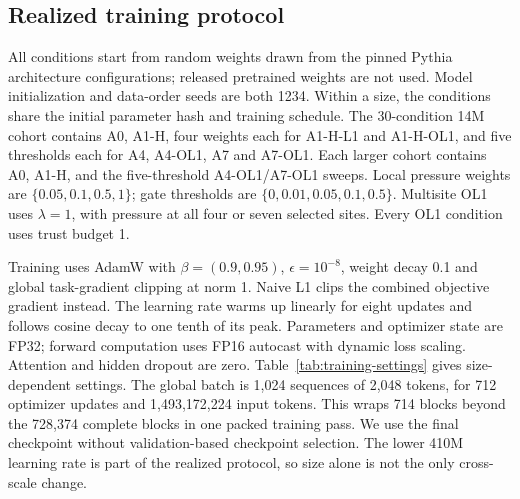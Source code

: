 \subsection{Realized training protocol}
\label{app:training-protocol}

All conditions start from random weights drawn from the pinned Pythia
architecture configurations; released pretrained weights are not used.
Model initialization and data-order seeds are both 1234. Within a size, the
conditions share the initial parameter hash and training schedule. The
30-condition 14M cohort contains A0, A1-H, four weights each for A1-H-L1 and
A1-H-OL1, and five thresholds each for A4, A4-OL1, A7 and A7-OL1. Each
larger cohort contains A0, A1-H, and the five-threshold A4-OL1/A7-OL1 sweeps.
Local pressure weights are $\{0.05,0.1,0.5,1\}$; gate thresholds are
$\{0,0.01,0.05,0.1,0.5\}$. Multisite OL1 uses $\lambda=1$, with pressure
at all four or seven selected sites. Every OL1 condition uses trust budget 1.

Training uses AdamW with $\beta=(0.9,0.95)$, $\epsilon=10^{-8}$, weight
decay 0.1 and global task-gradient clipping at norm 1. Naive L1 clips the
combined objective gradient instead. The learning rate warms up linearly
for eight updates and follows cosine decay to one tenth of its peak.
Parameters and optimizer state are FP32; forward computation uses FP16
autocast with dynamic loss scaling. Attention and hidden dropout are zero.
Table~\ref{tab:training-settings} gives size-dependent settings. The global
batch is 1,024 sequences of 2,048 tokens, for 712 optimizer updates and
1,493,172,224 input tokens. This wraps 714 blocks beyond the 728,374 complete
blocks in one packed training pass. We use the final checkpoint without
validation-based checkpoint selection. The lower 410M learning rate is part
of the realized protocol, so size alone is not the only cross-scale change.


